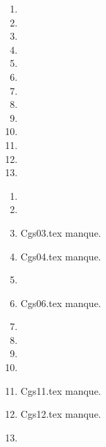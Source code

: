  
 
\begin{enumerate}
  \item  
  \item  
  \item  
  \item  
  \item  
  \item  
  \item  
  \item  
  \item  
  \item  
  \item  
  \item  
  \item  
\end{enumerate} 
\clearpage 
{}
\begin{enumerate}
  \item  
  \item  
  \item Cgs03.tex manque. 
  \item Cgs04.tex manque. 
  \item  
  \item Cgs06.tex manque. 
  \item  
  \item  
  \item  
  \item  
  \item Cgs11.tex manque. 
  \item Cgs12.tex manque. 
  \item  
\end{enumerate} 
